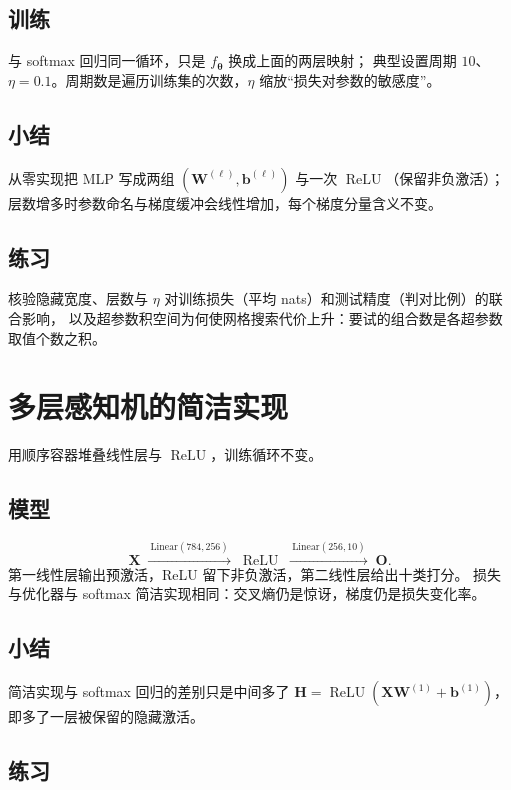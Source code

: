 \subsection{训练}

与 softmax 回归同一循环，只是 $f_{\bm{\theta}}$ 换成上面的两层映射；
典型设置周期 $10$、$\eta=0.1$。周期数是遍历训练集的次数，$\eta$ 缩放“损失对参数的敏感度”。

\subsection{小结}

从零实现把 MLP 写成两组 $(\bm{W}^{(\ell)},\bm{b}^{(\ell)})$ 与一次 $\operatorname{ReLU}$（保留非负激活）；
层数增多时参数命名与梯度缓冲会线性增加，每个梯度分量含义不变。

\subsection{练习}

核验隐藏宽度、层数与 $\eta$ 对训练损失（平均 nats）和测试精度（判对比例）的联合影响，
以及超参数积空间为何使网格搜索代价上升：要试的组合数是各超参数取值个数之积。

\section{多层感知机的简洁实现}

用顺序容器堆叠线性层与 $\operatorname{ReLU}$，训练循环不变。

\subsection{模型}

\[
\bm{X}
\;\xrightarrow{\ \mathrm{Linear}(784,256)\ }\;
\operatorname{ReLU}
\;\xrightarrow{\ \mathrm{Linear}(256,10)\ }\;
\bm{O}.
\]
第一线性层输出预激活，ReLU 留下非负激活，第二线性层给出十类打分。
损失与优化器与 softmax 简洁实现相同：交叉熵仍是惊讶，梯度仍是损失变化率。

\subsection{小结}

简洁实现与 softmax 回归的差别只是中间多了 $\bm{H}=\operatorname{ReLU}(\bm{X}\bm{W}^{(1)}+\bm{b}^{(1)})$，
即多了一层被保留的隐藏激活。

\subsection{练习}

